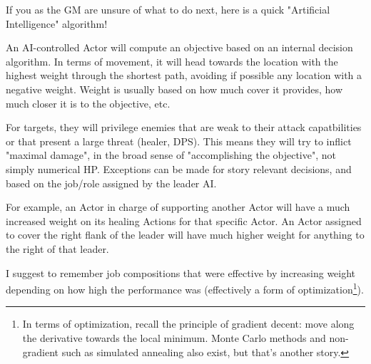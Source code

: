 If you as the GM are unsure of what to do next, here is a quick "Artificial Intelligence" algorithm!

An AI-controlled Actor will compute an objective based on an internal decision algorithm. In terms of movement, it will head towards the location with the highest weight through the shortest path, avoiding if possible any location with a negative weight. Weight is usually based on how much cover it provides, how much closer it is to the objective, etc.

For targets, they will privilege enemies that are weak to their attack capatbilities or that present a large threat (healer, DPS). This means they will try to inflict "maximal damage", in the broad sense of "accomplishing the objective", not simply numerical HP. Exceptions can be made for story relevant decisions, and based on the job/role assigned by the leader AI. 

For example, an Actor in charge of supporting another Actor will have a much increased weight on its healing Actions for that specific Actor. An Actor assigned to cover the right flank of the leader will have much higher weight for anything to the right of that leader.

I suggest to remember job compositions that were effective by increasing weight depending on how high the performance was (effectively a form of optimization\footnote{In terms of optimization, recall the principle of gradient decent: move along the derivative towards the local minimum. Monte Carlo methods and non-gradient such as simulated annealing also exist, but that's another story.}).







